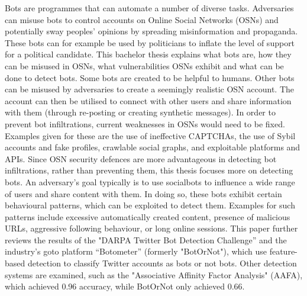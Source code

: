 Bots are programmes that can automate a number of diverse tasks. Adversaries can misuse bots to control accounts on Online Social Networks (OSNs) and potentially sway peoples' opinions by spreading misinformation and propaganda. These bots can for example be used by politicians to inflate the level of support for a political candidate.
This bachelor thesis explains what bots are, how they can be misused in OSNs, what vulnerabilities OSNs exhibit and what can be done to detect bots. Some bots are created to be helpful to humans. Other bots can be misused by adversaries to create a seemingly realistic OSN account. The account can then be utilised to connect with other users and share information with them (through re-posting or creating synthetic messages). In order to prevent bot infiltrations, current weaknesses in OSNs would need to be fixed. Examples given for these are the use of ineffective CAPTCHAs, the use of Sybil accounts and fake profiles, crawlable social graphs, and exploitable platforms and APIs. Since OSN security defences are more advantageous in detecting bot infiltrations, rather than preventing them, this thesis focuses more on detecting bots. 
An adversary's goal typically is to use socialbots to influence a wide range of users and share content with them. In doing so, these bots exhibit certain behavioural patterns, which can be exploited to detect them. Examples for such patterns include excessive automatically created content, presence of malicious URLs, aggressive following behaviour, or long online sessions. This paper further reviews the results of the "DARPA Twitter Bot Detection Challenge” and the industry's goto platform “Botometer” (formerly "BotOrNot"), which use feature-based detection to classify Twitter accounts as bots or not bots. Other detection systems are examined, such as the "Associative Affinity Factor Analysis" (AAFA), which achieved 0.96 accuracy, while BotOrNot only achieved 0.66.

